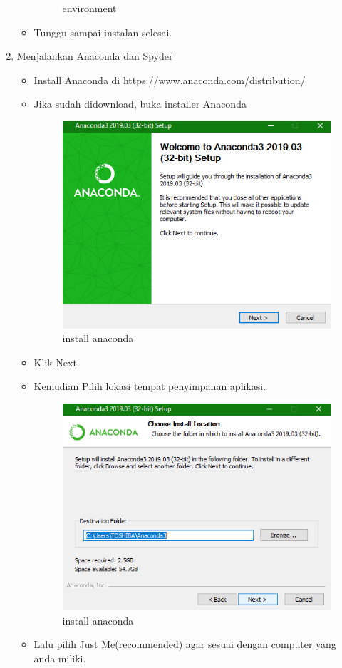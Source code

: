 \begin{enumerate}
\begin{itemize}
\begin{figure}[!htbp]
\caption{environment}
\end{figure}
\item Tunggu sampai instalan selesai.
\end{itemize}
\item 	Menjalankan Anaconda dan Spyder
\begin{itemize}
\item Install Anaconda di https://www.anaconda.com/distribution/
\item Jika sudah didownload, buka installer Anaconda
\begin{figure}[!htbp]
\centering
\includegraphics[width=10cm]{gambar/conda1.png}
\caption{install anaconda}
\end{figure}
\item Klik Next.
\item Kemudian Pilih lokasi tempat penyimpanan aplikasi.
\begin{figure}[!htbp]
\centering
\includegraphics[width=10cm]{gambar/conda2.png}
\caption{install anaconda}
\end{figure}
\item Lalu pilih Just Me(recommended) agar sesuai dengan computer yang anda miliki.

\end{itemize}
\end{enumerate}

